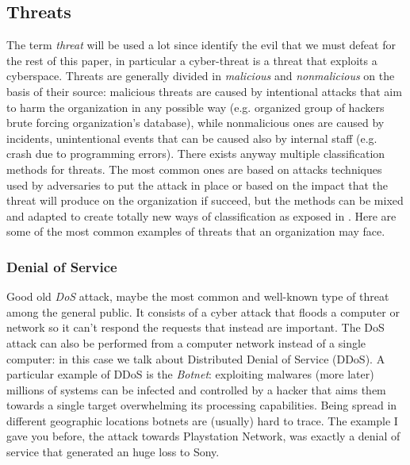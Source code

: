 \subsection{Threats}
The term \textit{threat} will be used a lot since identify the evil that we must defeat for the rest of this paper, in particular a cyber-threat is a threat that exploits a cyberspace.
Threats are generally divided in \textit{malicious} and \textit{nonmalicious} on the basis of their source: malicious threats are caused by intentional attacks that aim to harm the organization in any possible way (e.g. organized group of hackers brute forcing organization's database), while nonmalicious ones are caused by incidents, unintentional events that can be caused also by internal staff (e.g. crash due to programming errors). There exists anyway multiple classification methods for threats. The most common ones are based on attacks techniques used by adversaries to put the attack in place or based on the impact that the threat will produce on the organization if succeed, but the methods can be mixed and adapted to create totally new ways of classification as exposed in \cite{Jouini2014}. Here are some of the most common examples of threats that an organization may face.

\subsubsection{Denial of Service}
Good old \textit{DoS} attack, maybe the most common and well-known type of threat among the general public. It consists of a cyber attack that floods a computer or network so it can’t respond the requests that instead are important. The DoS attack can also be performed from a computer network instead of a single computer: in this case we talk about Distributed Denial of Service (DDoS). A particular example of DDoS is the \textit{Botnet}: exploiting malwares (more later) millions of systems can be infected and controlled by a hacker that aims them towards a single target overwhelming its processing capabilities. Being spread in different geographic locations botnets are (usually) hard to trace. The example I gave you before, the attack towards Playstation Network, was exactly a denial of service that generated an huge loss to Sony.

